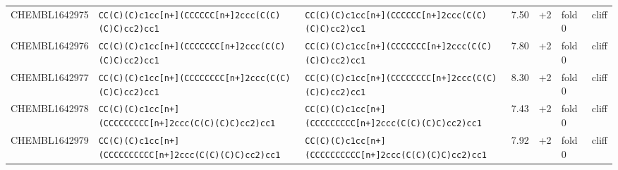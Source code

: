 \begin{longtable}{l p{4.4cm} p{4.4cm} r r l l}
CHEMBL1642975 & \texttt{CC(\allowbreak{}C)\allowbreak{}(\allowbreak{}C)\allowbreak{}c1cc[n+]\allowbreak{}(\allowbreak{}CCCCCC[n+]\allowbreak{}2ccc(\allowbreak{}C(\allowbreak{}C)\allowbreak{}(\allowbreak{}C)\allowbreak{}C)\allowbreak{}cc2)\allowbreak{}cc1} & \texttt{CC(\allowbreak{}C)\allowbreak{}(\allowbreak{}C)\allowbreak{}c1cc[n+]\allowbreak{}(\allowbreak{}CCCCCC[n+]\allowbreak{}2ccc(\allowbreak{}C(\allowbreak{}C)\allowbreak{}(\allowbreak{}C)\allowbreak{}C)\allowbreak{}cc2)\allowbreak{}cc1} & 7.50 & +2 & fold 0 & cliff \\
CHEMBL1642976 & \texttt{CC(\allowbreak{}C)\allowbreak{}(\allowbreak{}C)\allowbreak{}c1cc[n+]\allowbreak{}(\allowbreak{}CCCCCCC[n+]\allowbreak{}2ccc(\allowbreak{}C(\allowbreak{}C)\allowbreak{}(\allowbreak{}C)\allowbreak{}C)\allowbreak{}cc2)\allowbreak{}cc1} & \texttt{CC(\allowbreak{}C)\allowbreak{}(\allowbreak{}C)\allowbreak{}c1cc[n+]\allowbreak{}(\allowbreak{}CCCCCCC[n+]\allowbreak{}2ccc(\allowbreak{}C(\allowbreak{}C)\allowbreak{}(\allowbreak{}C)\allowbreak{}C)\allowbreak{}cc2)\allowbreak{}cc1} & 7.80 & +2 & fold 0 & cliff \\
CHEMBL1642977 & \texttt{CC(\allowbreak{}C)\allowbreak{}(\allowbreak{}C)\allowbreak{}c1cc[n+]\allowbreak{}(\allowbreak{}CCCCCCCC[n+]\allowbreak{}2ccc(\allowbreak{}C(\allowbreak{}C)\allowbreak{}(\allowbreak{}C)\allowbreak{}C)\allowbreak{}cc2)\allowbreak{}cc1} & \texttt{CC(\allowbreak{}C)\allowbreak{}(\allowbreak{}C)\allowbreak{}c1cc[n+]\allowbreak{}(\allowbreak{}CCCCCCCC[n+]\allowbreak{}2ccc(\allowbreak{}C(\allowbreak{}C)\allowbreak{}(\allowbreak{}C)\allowbreak{}C)\allowbreak{}cc2)\allowbreak{}cc1} & 8.30 & +2 & fold 0 & cliff \\
CHEMBL1642978 & \texttt{CC(\allowbreak{}C)\allowbreak{}(\allowbreak{}C)\allowbreak{}c1cc[n+]\allowbreak{}(\allowbreak{}CCCCCCCCC[n+]\allowbreak{}2ccc(\allowbreak{}C(\allowbreak{}C)\allowbreak{}(\allowbreak{}C)\allowbreak{}C)\allowbreak{}cc2)\allowbreak{}cc1} & \texttt{CC(\allowbreak{}C)\allowbreak{}(\allowbreak{}C)\allowbreak{}c1cc[n+]\allowbreak{}(\allowbreak{}CCCCCCCCC[n+]\allowbreak{}2ccc(\allowbreak{}C(\allowbreak{}C)\allowbreak{}(\allowbreak{}C)\allowbreak{}C)\allowbreak{}cc2)\allowbreak{}cc1} & 7.43 & +2 & fold 0 & cliff \\
CHEMBL1642979 & \texttt{CC(\allowbreak{}C)\allowbreak{}(\allowbreak{}C)\allowbreak{}c1cc[n+]\allowbreak{}(\allowbreak{}CCCCCCCCCC[n+]\allowbreak{}2ccc(\allowbreak{}C(\allowbreak{}C)\allowbreak{}(\allowbreak{}C)\allowbreak{}C)\allowbreak{}cc2)\allowbreak{}cc1} & \texttt{CC(\allowbreak{}C)\allowbreak{}(\allowbreak{}C)\allowbreak{}c1cc[n+]\allowbreak{}(\allowbreak{}CCCCCCCCCC[n+]\allowbreak{}2ccc(\allowbreak{}C(\allowbreak{}C)\allowbreak{}(\allowbreak{}C)\allowbreak{}C)\allowbreak{}cc2)\allowbreak{}cc1} & 7.92 & +2 & fold 0 & cliff \\

\end{longtable}
